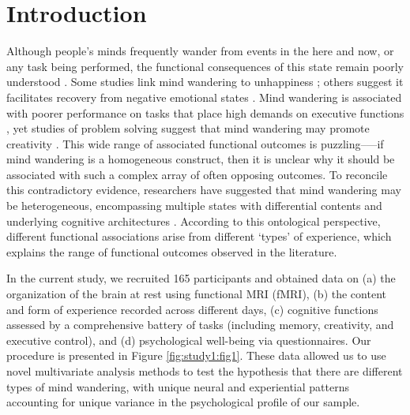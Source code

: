 \section{Introduction}
\label{study1:intro}

Although people's minds frequently wander from events in the here and now, or any task being performed, the functional consequences of this state remain poorly understood \cite{Mittner2016,SeliTiCS2016,SmallwoodFrontiers2013}.
Some studies link mind wandering to unhappiness
\cite{Killingsworth2010};
others suggest it facilitates recovery from negative emotional states
\cite{PoerioFrontiers2016,RubyPlos2013}.
Mind wandering is associated with poorer performance on tasks that place high demands on executive functions
\cite{McVay2009,MrazekJoEP2012},
yet studies of problem solving suggest that mind wandering may promote creativity
\cite{Baird2012,Smeekens2016}.
This wide range of associated functional outcomes is puzzling--—if mind wandering is a homogeneous construct, then it is unclear why it should be associated with such a complex array of often opposing outcomes. To reconcile this contradictory evidence, researchers have suggested that mind wandering may be heterogeneous, encompassing multiple states with differential contents and underlying cognitive architectures \cite{SmallwoodFrontiers2013}. According to this ontological perspective, different functional associations arise from different `types' of experience, which explains the range of functional outcomes observed in the literature.

In the current study, we recruited 165 participants and obtained data on (a) the organization of the brain at rest using functional MRI (fMRI), (b) the content and form of experience recorded across different days, (c) cognitive functions assessed by a comprehensive battery of tasks (including memory, creativity, and executive control), and (d) psychological well-being via questionnaires. Our procedure is presented in Figure \ref{fig:study1:fig1}. These data allowed us to use novel multivariate analysis methods to test the hypothesis that there are different types of mind wandering, with unique neural and experiential patterns accounting for unique variance in the psychological profile of our sample.

